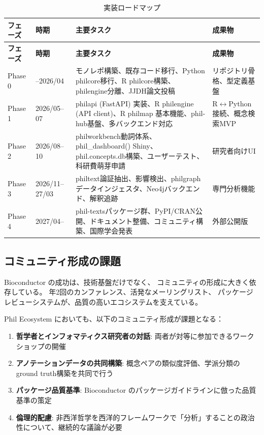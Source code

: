 \documentclass[a4paper,11pt]{ltjsarticle}
\begin{document}
\begin{longtable}{llp{6cm}l}
\caption{実装ロードマップ}\label{tab:roadmap}\\
\toprule
\textbf{フェーズ} & \textbf{時期} & \textbf{主要タスク} & \textbf{成果物} \\
\midrule
\endfirsthead
\toprule
\textbf{フェーズ} & \textbf{時期} & \textbf{主要タスク} & \textbf{成果物} \\
\midrule
\endhead
Phase 0 & --2026/04 & モノレポ構築、既存コード移行、Python philcore移行、R philcore構築、philengine分離、JJDH論文投稿 & リポジトリ骨格、型定義基盤 \\
\midrule
Phase 1 & 2026/05--07 & philapi (FastAPI) 実装、R philengine (API client)、R philmap 基本機能、phil-hub基盤、多バックエンド対応 & R$\leftrightarrow$Python接続、概念検索MVP \\
\midrule
Phase 2 & 2026/08--10 & philworkbench動詞体系、phil\_dashboard() Shiny、phil.concepts.db構築、ユーザーテスト、科研費萌芽申請 & 研究者向けUI \\
\midrule
Phase 3 & 2026/11--27/03 & philtext論証抽出、影響検出、philgraphデータインジェスタ、Neo4jバックエンド、解釈追跡 & 専門分析機能 \\
\midrule
Phase 4 & 2027/04-- & phil-textsパッケージ群、PyPI/CRAN公開、ドキュメント整備、コミュニティ構築、国際学会発表 & 外部公開版 \\
\bottomrule
\end{longtable}

\subsection{コミュニティ形成の課題}

Bioconductor の成功は、技術基盤だけでなく、
コミュニティの形成に大きく依存している。
年2回のカンファレンス、活発なメーリングリスト、
パッケージレビューシステムが、品質の高いエコシステムを支えている。

Phil Ecosystem においても、以下のコミュニティ形成が課題となる：

\begin{enumerate}[leftmargin=2em]
  \item \textbf{哲学者とインフォマティクス研究者の対話}: 両者が対等に参加できるワークショップの開催
  \item \textbf{アノテーションデータの共同構築}: 概念ペアの類似度評価、学派分類のground truth構築を共同で行う
  \item \textbf{パッケージ品質基準}: Bioconductor のパッケージガイドラインに倣った品質基準の策定
  \item \textbf{倫理的配慮}: 非西洋哲学を西洋的フレームワークで「分析」することの政治性について、継続的な議論が必要
\end{enumerate}
\end{document}
